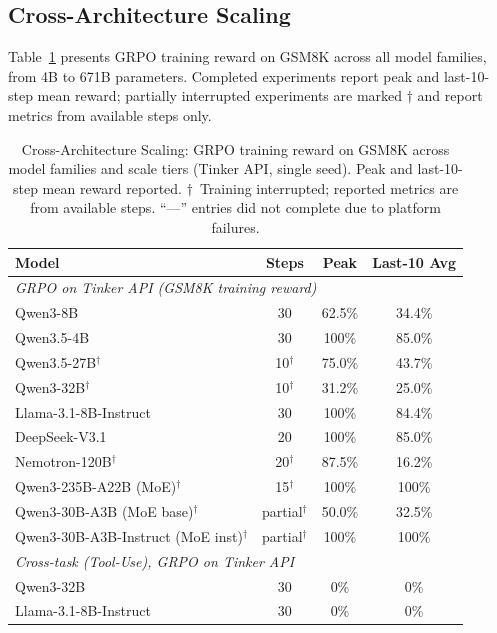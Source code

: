 \documentclass{article}
\begin{document}
\subsection{Cross-Architecture Scaling}
\label{sec:cross_arch_scaling}

Table~\ref{tab:cross_arch_scaling} presents GRPO training reward on GSM8K across
all model families, from 4B to 671B parameters. Completed experiments report
peak and last-10-step mean reward; partially interrupted experiments are
marked $\dagger$ and report metrics from available steps only.

\begin{table}[htbp]
\centering
\caption{Cross-Architecture Scaling: GRPO training reward on GSM8K across model families
and scale tiers (Tinker API, single seed). Peak and last-10-step mean reward reported.
$\dagger$~Training interrupted; reported metrics are from available steps.
``---'' entries did not complete due to platform failures.}
\label{tab:cross_arch_scaling}
\begin{tabular}{lccc}
\toprule
\textbf{Model} & \textbf{Steps} & \textbf{Peak} & \textbf{Last-10 Avg} \\
\midrule
\multicolumn{4}{l}{\textit{GRPO on Tinker API (GSM8K training reward)}} \\
\midrule
Qwen3-8B & 30 & 62.5\% & 34.4\% \\
Qwen3.5-4B & 30 & 100\% & 85.0\% \\
Qwen3.5-27B$^\dagger$ & 10$^\dagger$ & 75.0\% & 43.7\% \\
Qwen3-32B$^\dagger$ & 10$^\dagger$ & 31.2\% & 25.0\% \\
Llama-3.1-8B-Instruct & 30 & 100\% & 84.4\% \\
DeepSeek-V3.1 & 20 & 100\% & 85.0\% \\
Nemotron-120B$^\dagger$ & 20$^\dagger$ & 87.5\% & 16.2\% \\
Qwen3-235B-A22B (MoE)$^\dagger$ & 15$^\dagger$ & 100\% & 100\% \\
Qwen3-30B-A3B (MoE base)$^\dagger$ & partial$^\dagger$ & 50.0\% & 32.5\% \\
Qwen3-30B-A3B-Instruct (MoE inst)$^\dagger$ & partial$^\dagger$ & 100\% & 100\% \\
\midrule
\multicolumn{4}{l}{\textit{Cross-task (Tool-Use), GRPO on Tinker API}} \\
\midrule
Qwen3-32B & 30 & 0\% & 0\% \\
Llama-3.1-8B-Instruct & 30 & 0\% & 0\% \\
\bottomrule
\end{tabular}
\end{table}
\end{document}

